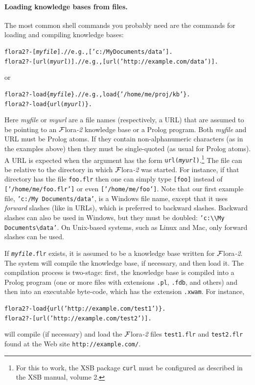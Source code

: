 \documentclass[11pt]{article}
\newcommand{\FLORA}{{\mbox{\sc ${\cal F}${lora}\rm\emph{-2}}}\xspace}
\newcommand{\FLSYSTEM}{\FLORA}
\newcommand{\prompt}{flora2 ?- }
\newcommand{\flrext}{flr\xspace}
\newcommand{\bs}{\textbackslash}
\newcommand{\ofile}{xwam}
\begin{document}
\paragraph{Loading knowledge bases from files.}
The most common shell commands you probably need are the commands for
loading and compiling knowledge bases:
\begin{alltt}
  \prompt  [\textit{myfile}].        // e.g., ['c:/My Documents/data'].
  \prompt  [url(\textit{myurl})].    // e.g., [url('http://example.com/data')].
\end{alltt}
or 
\begin{alltt}
  \prompt load\{\textit{myfile}\}.     // e.g., load\{'/home/me/proj/kb'\}.
  \prompt load\{url(\textit{myurl})\}.
\end{alltt}
Here \emph{myfile} or \emph{myurl} are a file names
(respectively, a URL) that are assumed to
be pointing to an \FLSYSTEM knowledge base
or a Prolog program. Both \emph{myfile} and URL must be
Prolog  atoms. If they contain non-alphanumeric characters (as in the examples
above) then they must be single-quoted (as usual for Prolog atoms).
A URL is expected
when the argument has the form {\tt url(\textit{myurl})}.\footnote{
  For this to work, the XSB package {\tt curl} must be configured as
  described in the XSB manual, volume 2. 
}
The file can be relative to the directory in which \FLSYSTEM was started.
For instance, if that directory has the file \texttt{foo.\flrext} then one
can simply type  \texttt{[foo]} instead of
\texttt{['/home/me/foo.\flrext']}
or even \texttt{['/home/me/foo']}.
Note that our first example file, \texttt{'c:/My Documents/data'}, is a
Windows file name, except that it uses \emph{forward} slashes (like in
URLs), which is preferred to backward slashes. Backward slashes can also be used in
Windows,  but they must be doubled:
\texttt{'c:\bs\bs{}My Documents\bs{}data'}. On Unix-based systems, such as
Linux and Mac, only forward slashes can be used.

If \texttt{\textit{myfile}.\flrext} exists, it is assumed to be a knowledge
base written for \FLSYSTEM. The
system will compile the knowledge base, if necessary, and then load it. The
compilation process is two-stage: first, the knowledge base is compiled into a
Prolog program (one or more files with extensions {\tt .pl}, {\tt .fdb}, and
others)
and then into an executable byte-code, which has the extension {\tt .\ofile}.
For instance, 
\begin{alltt}
  \prompt load\{url('http://example.com/test1')\}.
  \prompt [url('http://example.com/test2')].
\end{alltt}
will compile (if necessary) and load the \FLSYSTEM files
{\tt test1.\flrext} and
{\tt test2.\flrext} found at the Web site {\tt http://example.com/}.   
\end{document}
